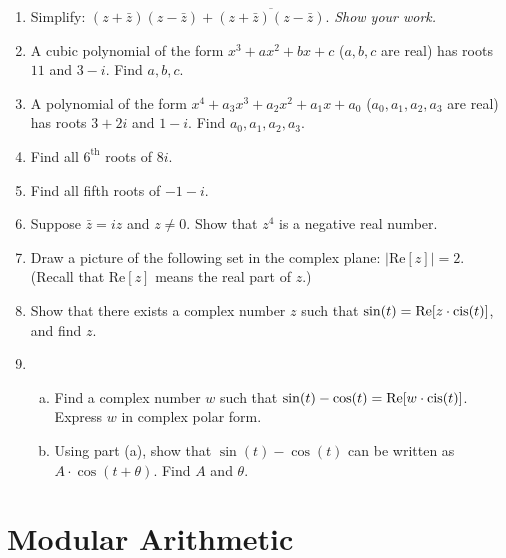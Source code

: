 \begin{enumerate}
\item
Simplify:  $(z + \bar{z})(z - \bar{z}) + \overline{(z + \bar{z})(z - \bar{z})}$. \emph{Show your work.}

\item
A cubic polynomial of the form $x^3 + ax^2 + bx + c$  ($a,b,c$ are real)  has roots $11$ and $3-i$.  Find $a,b,c$.

\item
A polynomial of the form $x^4 + a_3x^3 + a_2x^2 + a_1x + a_0$  ($a_0,a_1,a_2,a_3$ are real)  has roots $3+2i$ and $1-i$.  Find $a_0,a_1,a_2,a_3$.

\item
Find all $6^{\text{th}}$ roots of  $8i$.


\item
Find all fifth roots of $-1-i$.

\item
Suppose $\bar{z} = iz$ and $z \neq 0$. Show that $z^4$ is a negative real number.

\item
Draw a picture of the following set in the complex plane:  $|\textrm{Re}[z] | = 2$.  (Recall that $\textrm{Re}[z]$ means the real part of $z$.)

\item
Show that there exists a complex number $z$ such that $\sin(t) = \text{Re}[z \cdot \operatorname{cis}(t)]$, and find $z$.

\item
\begin{enumerate}[(a)]
\item 
Find a complex number $w$ such that $\sin(t) - \cos(t) = \textrm{Re}[ w \cdot \operatorname{cis}(t) ]$. Express $w$ in complex polar form.  
\item
Using part (a), show that  $\sin(t) - \cos(t)$ can be written as $ A \cdot \cos(t + \theta)$. Find $A$ and $\theta$.  
\end{enumerate}

\end{enumerate}



\section{Modular Arithmetic}

